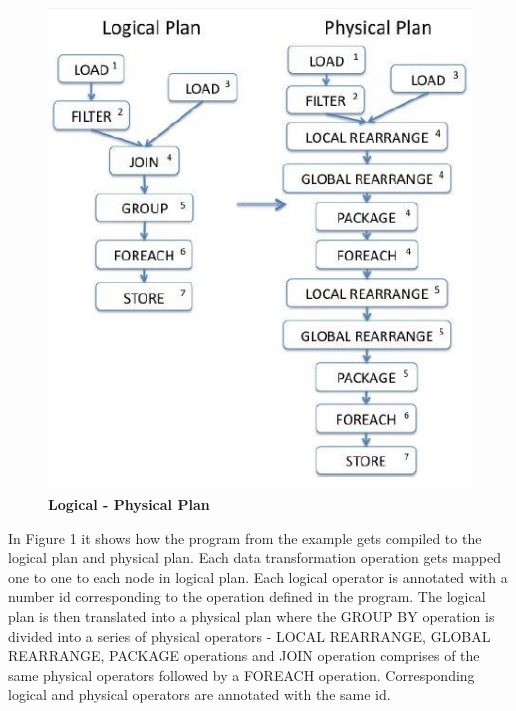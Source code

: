 \begin{figure}
\begin{center}
\includegraphics[scale=0.5]{Images/LogicalPhysicalPlan.JPG} 
\end{center}
\caption{\textbf{Logical - Physical Plan\cite{gates2009building}}}
\end{figure}
In Figure 1 it shows how the program from the example gets compiled to the logical plan and physical plan. Each data transformation operation gets mapped one to one to each node in logical plan. Each logical operator is annotated with a number id corresponding to the operation defined in the program. The logical plan is then translated into a physical plan where the GROUP BY operation is divided into a series of physical operators - LOCAL REARRANGE, GLOBAL REARRANGE, PACKAGE operations and JOIN operation comprises of the same physical operators followed by a FOREACH operation. Corresponding logical and physical operators are annotated with the same id.
